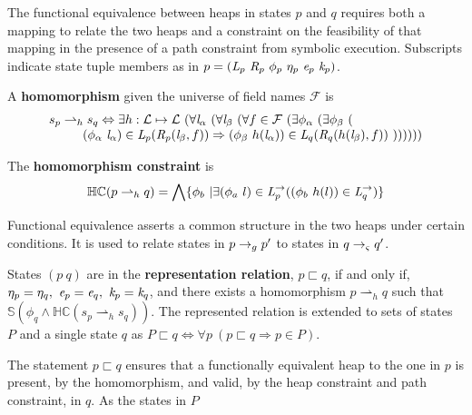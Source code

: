 The functional equivalence between heaps in states $p$
and $q$ requires both a mapping to relate the two heaps and a
constraint on the feasibility of that mapping in the presence of a
path constraint from symbolic execution. Subscripts indicate state tuple
members as in $p = (
\emph{L}_p\ \emph{R}_p\ \phi_p\ \eta_p\ \emph{e}_p\ \emph{k}_p )$.
\begin{definition}
\label{def:homomorphism}
A \textbf{homomorphism} given the universe of field names $\mathcal{F}$ is 
$$
\begin{array}{l}
 s_p \rightharpoonup_{h} s_q \Leftrightarrow 
\exists h: \mathcal{L} \mapsto \mathcal{L}\ (\forall \cfgnt{l}_\alpha\ (\forall \cfgnt{l}_\beta\ (\forall f \in \mathcal{F}\ ( \exists \phi_\alpha\ (\exists \phi_\beta\ ( \\ 
\ \ \ \ \ \ \ \ (\phi_\alpha\ \cfgnt{l}_\alpha) \in \cfgnt{L}_p(\cfgnt{R}_p (\cfgnt{l}_\beta,f )) \Rightarrow 
(\phi_\beta\ h(\cfgnt{l}_\alpha))\in \cfgnt{L}_q(\cfgnt{R}_q (h(\cfgnt{l}_\beta),f ))\ 
 )) ) ) ) )
\end{array}
$$
\end{definition}
\begin{definition}
\label{def:hc}
The \textbf{homomorphism constraint} is
\[
\mathbb{HC}(p \rightharpoonup_{h} q) = 
\bigwedge \{ \phi_b\ | \exists (\phi_a\ l) \in \emph{L}_p^\rightarrow ( (\phi_b\ h(l)) \in \emph{L}_q^\rightarrow)\}
\]
\end{definition}
Functional equivalence asserts a common structure in the two heaps under certain
conditions. It is used to relate states in $p \rightarrow_{g}
p^\prime$ to states in $q \rightarrow_{\varsigma} q^\prime$.
\begin{definition}
\label{representation}
States $(p\ q)$ are in the \textbf{representation relation}, $p \sqsubset q$, if and only if, $\eta_p = \eta_q ,\ \cfgnt{e}_p =
\cfgnt{e}_q ,\ \cfgnt{k}_p = \cfgnt{k}_q$, and there exists a
homomorphism $p \rightharpoonup_{h} q$
such that $\mathbb{S}( \phi_q \wedge \mathbb{HC}(s_p \rightharpoonup_{h} s_q) )$.
The represented relation is extended to sets of states $P$ and a single state $q$ as
$P \sqsubset q \Longleftrightarrow \forall p\ (p \sqsubset q \Rightarrow p \in P)$.
\end{definition}
The statement $p \sqsubset q$ ensures that a functionally equivalent
heap to the one in $p$ is present, by the homomorphism, and valid, by
the heap constraint and path constraint, in $q$. As the states in $P$
